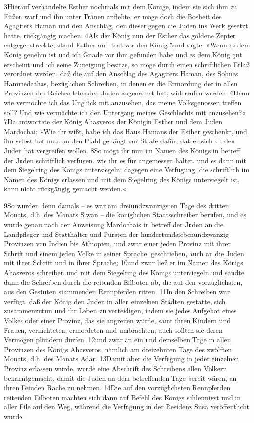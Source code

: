 3Hierauf verhandelte Esther nochmals mit dem Könige, indem sie sich ihm
zu Füßen warf und ihn unter Tränen anflehte, er möge doch die Bosheit
des Agagiters Haman und den Anschlag, den dieser gegen die Juden ins
Werk gesetzt hatte, rückgängig machen. 4Als der König nun der Esther das
goldene Zepter entgegenstreckte, stand Esther auf, trat vor den König
5und sagte: »Wenn es dem König genehm ist und ich Gnade vor ihm gefunden
habe und es dem König gut erscheint und ich seine Zuneigung besitze, so
möge durch einen schriftlichen Erlaß verordnet werden, daß die auf den
Anschlag des Agagiters Haman, des Sohnes Hammedathas, bezüglichen
Schreiben, in denen er die Ermordung der in allen Provinzen des Reiches
lebenden Juden angeordnet hat, widerrufen werden. 6Denn wie vermöchte
ich das Unglück mit anzusehen, das meine Volksgenossen treffen soll? Und
wie vermöchte ich den Untergang meines Geschlechts mit anzusehen?« 7Da
antwortete der König Ahasveros der Königin Esther und dem Juden
Mardochai: »Wie ihr wißt, habe ich das Haus Hamans der Esther geschenkt,
und ihn selbst hat man an den Pfahl gehängt zur Strafe dafür, daß er
sich an den Juden hat vergreifen wollen. 8So mögt ihr nun im Namen des
Königs in betreff der Juden schriftlich verfügen, wie ihr es für
angemessen haltet, und es dann mit dem Siegelring des Königs
untersiegeln; dagegen eine Verfügung, die schriftlich im Namen des
Königs erlassen und mit dem Siegelring des Königs untersiegelt ist, kann
nicht rückgängig gemacht werden.«

9So wurden denn damals -- es war am dreiundzwanzigsten Tage des dritten
Monats, d.h. des Monats Siwan -- die königlichen Staatsschreiber
berufen, und es wurde genau nach der Anweisung Mardochais in betreff der
Juden an die Landpfleger und Statthalter und Fürsten der
hundertundsiebenundzwanzig Provinzen von Indien bis Äthiopien, und zwar
einer jeden Provinz mit ihrer Schrift und einem jeden Volke in seiner
Sprache, geschrieben, auch an die Juden mit ihrer Schrift und in ihrer
Sprache; 10und zwar ließ er im Namen des Königs Ahasveros schreiben und
mit dem Siegelring des Königs untersiegeln und sandte dann die Schreiben
durch die reitenden Eilboten ab, die auf den vorzüglichsten, aus den
Gestüten stammenden Rennpferden ritten. 11In den Schreiben war verfügt,
daß der König den Juden in allen einzelnen Städten gestatte, sich
zusammenzutun und ihr Leben zu verteidigen, indem sie jedes Aufgebot
eines Volkes oder einer Provinz, das sie angreifen würde, samt ihren
Kindern und Frauen, vernichteten, ermordeten und umbrächten; auch
sollten sie deren Vermögen plündern dürfen, 12und zwar an ein und
demselben Tage in allen Provinzen des Königs Ahasveros, nämlich am
dreizehnten Tage des zwölften Monats, d.h. des Monats Adar. 13Damit aber
die Verfügung in jeder einzelnen Provinz erlassen würde, wurde eine
Abschrift des Schreibens allen Völkern bekanntgemacht, damit die Juden
an dem betreffenden Tage bereit wären, an ihren Feinden Rache zu nehmen.
14Die auf den vorzüglichsten Rennpferden reitenden Eilboten machten sich
dann auf Befehl des Königs schleunigst und in aller Eile auf den Weg,
während die Verfügung in der Residenz Susa veröffentlicht wurde.


